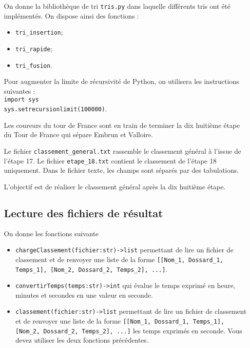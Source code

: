 

On donne la bibliothèque de tri \texttt{tris.py} dans laquelle différents tris ont été implémentés.
On dispose ainsi des fonctions : 
\begin{itemize}
\item \texttt{tri\_insertion};
\item \texttt{tri\_rapide};
\item \texttt{tri\_fusion}.
\end{itemize}

\vspace{0.5cm}

Pour augmenter la limite de récursivité de Python, on utilisera les instructions suivantes :\\
\texttt{import sys}\\
\texttt{sys.setrecursionlimit(100000)}.




Les coureurs du tour de France sont en train de terminer la dix huitième étape du Tour de France qui sépare Embrun et Valloire. 

Le fichier \texttt{classement\_general.txt} rassemble le classement général à l'issue de l'étape 17. Le fichier \texttt{etape\_18.txt} contient le classement de l'étape 18 uniquement. Dans le fichier texte, les champs sont séparés par des tabulations.

\begin{obj}
  L'objectif est de réaliser le classement général après la dix huitième étape.
\end{obj}


\subsection*{Lecture des fichiers de résultat}

On donne les fonctions suivante

\begin{itemize}
\item  \texttt{chargeClassement(fichier:str)->list} permettant de lire un fichier de classement 
et de renvoyer une liste de la forme \texttt{[[Nom\_1, Dossard\_1, Temps\_1], [Nom\_2, Dossard\_2, Temps\_2], ...]}.
\item \texttt{convertirTemps(temps:str)->int} qui évalue le temps exprimé en heure, minutes et secondes en une valeur en seconde.\\
\item  \texttt{classement(fichier:str)->list}  permettant de lire un fichier de classement 
et de renvoyer une liste de la forme \texttt{[[Nom\_1, Dossard\_1, Temps\_1], [Nom\_2, Dossard\_2, Temps\_2], ...]} les temps exprimés en seconde. Vous devez utiliser les deux fonctions précédentes.\\
\end{itemize}


